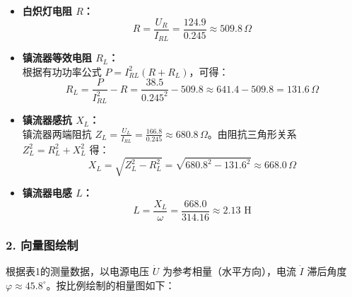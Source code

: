 \documentclass[10.5pt]{config}
\begin{document}
\begin{itemize}[leftmargin=2em]
    \item \textbf{白炽灯电阻 $R$：}
    \begin{equation*}
        R = \frac{U_R}{I_{RL}} = \frac{124.9}{0.245} \approx 509.8 \, \Omega
    \end{equation*}

    \item \textbf{镇流器等效电阻 $R_L$：} \\
    根据有功功率公式 $P = I_{RL}^2(R + R_L)$，可得：
    \begin{equation*}
        R_L = \frac{P}{I_{RL}^2} - R = \frac{38.5}{0.245^2} - 509.8 \approx 641.4 - 509.8 = 131.6 \, \Omega
    \end{equation*}

    \item \textbf{镇流器感抗 $X_L$：} \\
    镇流器两端阻抗 $Z_L = \frac{U_L}{I_{RL}} = \frac{166.8}{0.245} \approx 680.8 \, \Omega$。由阻抗三角形关系 $Z_L^2 = R_L^2 + X_L^2$ 得：
    \begin{equation*}
        X_L = \sqrt{Z_L^2 - R_L^2} = \sqrt{680.8^2 - 131.6^2} \approx 668.0 \, \Omega
    \end{equation*}

    \item \textbf{镇流器电感 $L$：}
    \begin{equation*}
        L = \frac{X_L}{\omega} = \frac{668.0}{314.16} \approx 2.13\text{ H}
    \end{equation*}
\end{itemize}

\subsubsection*{2. 向量图绘制}

根据表1的测量数据，以电源电压 $\dot{U}$ 为参考相量（水平方向），电流 $\dot{I}$ 滞后角度 $\varphi \approx 45.8^\circ$。按比例绘制的相量图如下：
\end{document}
